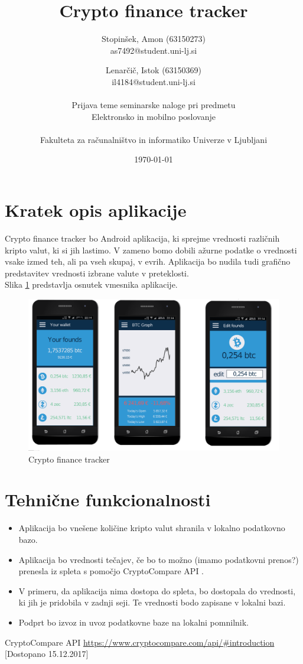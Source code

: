 \documentclass[11pt,a4paper]{article}
\title{Crypto finance tracker}
\author{
	Stopinšek, Amon (63150273)\\
	as7492@student.uni-lj.si\\
	\and
	Lenarčič, Istok (63150369)\\
	il4184@student.uni-lj.si\\
\ \\
Prijava teme seminarske naloge pri predmetu\\
Elektronsko in mobilno poslovanje \\
\\
Fakulteta za računalništvo in informatiko Univerze v Ljubljani
\date{\today}         
}
\begin{document}
\maketitle


\section{Kratek opis aplikacije}

Crypto finance tracker bo Android aplikacija, ki sprejme vrednosti različnih kripto valut, ki si jih lastimo. V zameno bomo dobili ažurne podatke o vrednosti vsake izmed teh, ali pa vseh skupaj, v evrih. Aplikacija bo nudila tudi grafično predstavitev vrednosti izbrane valute v preteklosti.\\

Slika \ref{fig:mockup} predstavlja osnutek vmesnika aplikacije.

\begin{figure}[htb]
	\begin{center}
		\includegraphics[width=0.8\columnwidth]{mockup}
	\end{center}
	\caption{Crypto finance tracker}
	\label{fig:mockup}
\end{figure}

\section{Tehnične funkcionalnosti}

\begin{itemize}
	\item Aplikacija bo vnešene količine kripto valut shranila v lokalno podatkovno bazo.
	\item Aplikacija bo vrednosti tečajev, če bo to možno (imamo podatkovni prenos?) prenesla iz spleta s pomočjo CryptoCompare API \cite{ccapi}.
	\item V primeru, da aplikacija nima dostopa do spleta, bo dostopala do vrednosti, ki jih je pridobila v zadnji seji. Te vrednosti bodo zapisane v lokalni bazi.
	\item Podprt bo izvoz in uvoz podatkovne baze na lokalni pomnilnik.
\end{itemize}


\begin{thebibliography}{9}
	
	CryptoCompare API
	\url{https://www.cryptocompare.com/api/#introduction}
	[Dostopano 15.12.2017]
	
	
\end{thebibliography}
\end{document}
